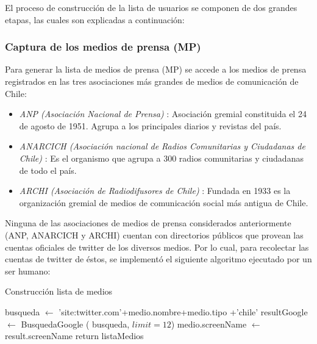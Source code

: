 El proceso de construcción de la lista de usuarios se componen de dos grandes etapas, las cuales son explicadas a continuación:



\subsubsection{Captura de los medios de prensa (MP)}

Para generar la lista de medios de prensa (MP) se accede a los medios de prensa registrados en las tres asociaciones más grandes de medios de comunicación de Chile:
\begin{itemize}
	\item \textit{ANP (Asociación Nacional de Prensa)} \cite{anpWebsite}: Asociación gremial constituida el 24 de agosto de 1951. Agrupa a los principales diarios y revistas del país.
	\item \textit{ANARCICH (Asociación nacional de Radios Comunitarias y Ciudadanas de Chile)} \cite{anarcichWebsite}: Es el organismo que agrupa a 300 radios comunitarias y ciudadanas de todo el país. 
	\item \textit{ARCHI (Asociación de Radiodifusores de Chile)} \cite{archiWebsite}: Fundada en 1933 es la organización gremial de medios de comunicación social más antigua de Chile.
\end{itemize}	

Ninguna de las asociaciones de medios de prensa considerados anteriormente (ANP, ANARCICH y ARCHI) cuentan con directorios públicos \cite{mediosArchi} \cite{mediosaAnp} \cite{mediosAnarcich} que provean las cuentas oficiales de twitter de los diversos medios. Por lo cual, para recolectar las cuentas de twitter de éstos, se implementó el siguiente algoritmo ejecutado por un ser humano:

\begin{algorithm}[H]
	\caption{Construcción lista de medios}\label{mediosPrensa}
	\begin{algorithmic}[1]
		\State busqueda $\gets$ 'site:twitter.com'+medio.nombre+medio.tipo +'chile'
		\State resultGoogle $\gets$ BusquedaGoogle ( busqueda, $limit=12$)
		\State medio.screenName $\gets$ result.screenName
		\EndIf 
		\EndFor
		\EndFor
		\State return listaMedios
		\EndFunction	
	\end{algorithmic}
\end{algorithm}

